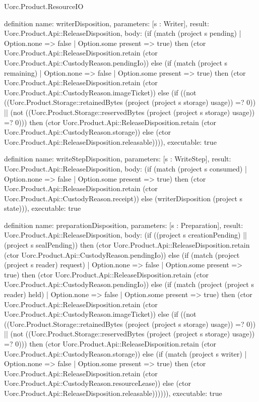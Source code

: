 \begin{lexlean}{Uorc.Product.ResourceIO}
\begin{semanticmodule}
definition{
  name: writerDisposition,
  parameters: [s : Writer],
  result: Uorc.Product.Api::ReleaseDisposition,
  body: (if (match (project s pending)
    | Option.none => false
    | Option.some present => true) then (ctor Uorc.Product.Api::ReleaseDisposition.retain (ctor Uorc.Product.Api::CustodyReason.pendingIo)) else (if (match (project s remaining)
    | Option.none => false
    | Option.some present => true) then (ctor Uorc.Product.Api::ReleaseDisposition.retain (ctor Uorc.Product.Api::CustodyReason.imageTicket)) else (if ((not ((Uorc.Product.Storage::retainedBytes (project (project s storage) usage)) =? 0)) || (not ((Uorc.Product.Storage::reservedBytes (project (project s storage) usage)) =? 0))) then (ctor Uorc.Product.Api::ReleaseDisposition.retain (ctor Uorc.Product.Api::CustodyReason.storage)) else (ctor Uorc.Product.Api::ReleaseDisposition.releasable)))),
  executable: true
}

definition{
  name: writeStepDisposition,
  parameters: [s : WriteStep],
  result: Uorc.Product.Api::ReleaseDisposition,
  body: (if (match (project s consumed)
    | Option.none => false
    | Option.some present => true) then (ctor Uorc.Product.Api::ReleaseDisposition.retain (ctor Uorc.Product.Api::CustodyReason.receipt)) else (writerDisposition (project s state))),
  executable: true
}

definition{
  name: preparationDisposition,
  parameters: [s : Preparation],
  result: Uorc.Product.Api::ReleaseDisposition,
  body: (if ((project s creationPending) || (project s sealPending)) then (ctor Uorc.Product.Api::ReleaseDisposition.retain (ctor Uorc.Product.Api::CustodyReason.pendingIo)) else (if (match (project (project s reader) request)
    | Option.none => false
    | Option.some present => true) then (ctor Uorc.Product.Api::ReleaseDisposition.retain (ctor Uorc.Product.Api::CustodyReason.pendingIo)) else (if (match (project (project s reader) held)
    | Option.none => false
    | Option.some present => true) then (ctor Uorc.Product.Api::ReleaseDisposition.retain (ctor Uorc.Product.Api::CustodyReason.imageTicket)) else (if ((not ((Uorc.Product.Storage::retainedBytes (project (project s storage) usage)) =? 0)) || (not ((Uorc.Product.Storage::reservedBytes (project (project s storage) usage)) =? 0))) then (ctor Uorc.Product.Api::ReleaseDisposition.retain (ctor Uorc.Product.Api::CustodyReason.storage)) else (if (match (project s writer)
    | Option.none => false
    | Option.some present => true) then (ctor Uorc.Product.Api::ReleaseDisposition.retain (ctor Uorc.Product.Api::CustodyReason.resourceLease)) else (ctor Uorc.Product.Api::ReleaseDisposition.releasable)))))),
  executable: true
}


\end{semanticmodule}
\end{lexlean}
